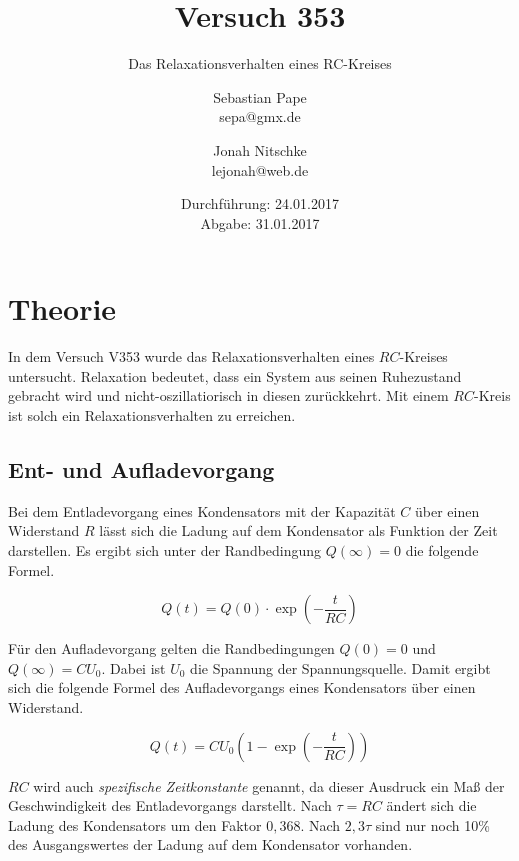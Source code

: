 

\title{Versuch 353}
\subtitle{Das Relaxationsverhalten eines RC-Kreises}
\author{Sebastian Pape\\
        sepa@gmx.de \and
        Jonah Nitschke\\
        lejonah@web.de}
\date{Durchführung: 24.01.2017\\
      Abgabe: 31.01.2017}


\maketitle
\setcounter{page}{1}

\section{Theorie}

In dem Versuch V353 wurde das Relaxationsverhalten eines $RC$-Kreises untersucht.
Relaxation bedeutet, dass ein System aus seinen Ruhezustand gebracht wird
und nicht-oszillatiorisch in diesen zurückkehrt.
Mit einem $RC$-Kreis ist solch ein Relaxationsverhalten zu erreichen.

\subsection{Ent- und Aufladevorgang}

Bei dem Entladevorgang eines Kondensators mit der Kapazität $C$ über einen Widerstand
$R$ lässt sich die Ladung auf dem Kondensator als Funktion der Zeit darstellen.
Es ergibt sich unter der Randbedingung $Q(\infty) = 0$ die folgende Formel.

\begin{equation}
  \label{eqn:Entladen}
  Q(t) = Q(0)\cdot \exp{(-\frac{t}{RC})}
\end{equation}

Für den Aufladevorgang gelten die Randbedingungen $Q(0) = 0$ und $Q(\infty) = CU_0$. Dabei ist $U_0$ die Spannung der Spannungsquelle. Damit ergibt sich
die folgende Formel des Aufladevorgangs eines Kondensators über einen Widerstand.

\begin{equation}
  \label{eqn:aufladen}
  Q(t) = CU_0(1 - \exp{(-\frac{t}{RC})})
\end{equation}

$RC$ wird auch \emph{spezifische Zeitkonstante} genannt, da dieser Ausdruck ein Maß
der Geschwindigkeit des Entladevorgangs darstellt.
Nach $\tau = RC$ ändert sich die Ladung des Kondensators um den Faktor $0,368$. Nach $2,3\tau$ sind nur noch 10\% des Ausgangswertes der Ladung auf dem
Kondensator vorhanden.


